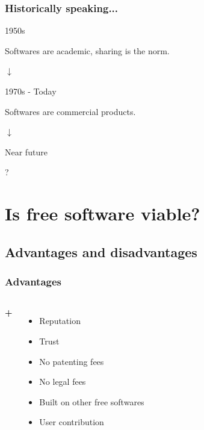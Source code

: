\documentclass{beamer}
\begin{document}
\begin{frame}

  \frametitle{Historically speaking...}

  \begin{block}{1950s}
    \begin{center}Softwares are academic, sharing is the norm.\end{center}
  \end{block}

  \begin{center} $\downarrow$ \end{center}

  \begin{block}{1970s - Today}
    \begin{center}Softwares are commercial products.\end{center}
  \end{block}

  \begin{center} $\downarrow$ \end{center}

  \begin{block}{Near future}
    \begin{center}?\end{center}
  \end{block}

\end{frame}

\section{Is free software viable?}

\subsection{Advantages and disadvantages}

\begin{frame}

  \frametitle{Advantages}

  \begin{columns}

    \Huge{\textbf{+}}

    \begin{itemize}
      \item<2->{Reputation}
      \item<3->{Trust}
      \item<4->{No patenting fees}
      \item<5->{No legal fees}
      \item<6->{Built on other free softwares}
      \item<7>{User contribution}
    \end{itemize}

  \end{columns}

\end{frame}
\end{document}
